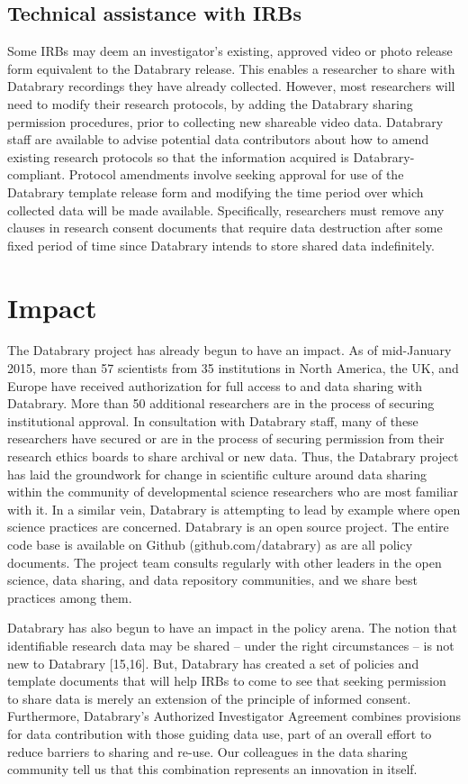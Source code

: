 \documentclass{sig-alternate}
\begin{document}
\subsection{Technical assistance with IRBs}

Some IRBs may deem an investigator’s existing, approved video or photo
release form equivalent to the Databrary release. This enables a
researcher to share with Databrary recordings they have already
collected. However, most researchers will need to modify their research
protocols, by adding the Databrary sharing permission procedures, prior
to collecting new shareable video data. Databrary staff are available to
advise potential data contributors about how to amend existing research
protocols so that the information acquired is Databrary-compliant.
Protocol amendments involve seeking approval for use of the Databrary
template release form and modifying the time period over which collected
data will be made available. Specifically, researchers must remove any
clauses in research consent documents that require data destruction
after some fixed period of time since Databrary intends to store shared
data indefinitely.

\section{Impact}

The Databrary project has already begun to have an impact. As of
mid-January 2015, more than 57 scientists from 35 institutions in North
America, the UK, and Europe have received authorization for full access
to and data sharing with Databrary. More than 50 additional researchers
are in the process of securing institutional approval. In consultation
with Databrary staff, many of these researchers have secured or are in
the process of securing permission from their research ethics boards to
share archival or new data. Thus, the Databrary project has laid the
groundwork for change in scientific culture around data sharing within
the community of developmental science researchers who are most familiar
with it. In a similar vein, Databrary is attempting to lead by example
where open science practices are concerned. Databrary is an open source
project. The entire code base is available on Github
(github.com/databrary) as are all policy documents. The project team
consults regularly with other leaders in the open science, data sharing,
and data repository communities, and we share best practices among them.

Databrary has also begun to have an impact in the policy arena. The
notion that identifiable research data may be shared – under the right
circumstances – is not new to Databrary [15,16]. But, Databrary has
created a set of policies and template documents that will help IRBs to
come to see that seeking permission to share data is merely an extension
of the principle of informed consent. Furthermore, Databrary’s
Authorized Investigator Agreement combines provisions for data
contribution with those guiding data use, part of an overall effort to
reduce barriers to sharing and re-use. Our colleagues in the data
sharing community tell us that this combination represents an innovation
in itself.
\end{document}

